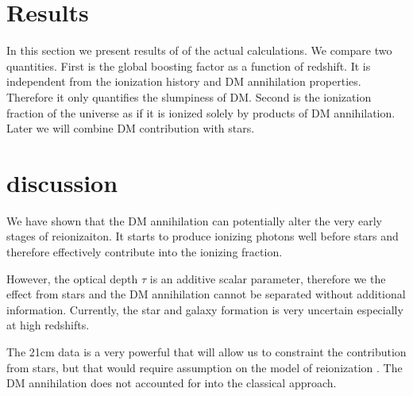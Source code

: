 \section{Results}
\label{sec:results}

In this section we present results of of the actual calculations. We compare two quantities. First is the global boosting factor as a function of redshift. It is independent from the ionization history and DM annihilation properties. Therefore it only quantifies the slumpiness of DM. Second is the ionization fraction of the universe as if it is ionized solely by products of DM annihilation. Later we will combine DM contribution with stars.

\section{discussion}

We have shown that the DM annihilation can potentially alter the very early stages of reionizaiton. It starts to produce ionizing photons well before stars and therefore effectively contribute into the ionizing fraction. 

However, the optical depth $\tau$ is an additive scalar parameter, therefore we the effect from stars and the DM annihilation cannot be separated without additional information. Currently, the star and galaxy formation is very uncertain especially at high redshifts.

The 21cm data is a very powerful that will allow us to constraint the contribution from stars, but that would require assumption on the model of reionization \cite{2015arXiv150908463L}. The DM annihilation does not accounted for into the classical approach.